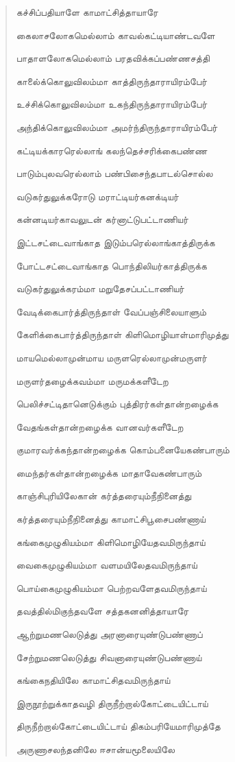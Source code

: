 \documentclass{article}
\begin{document}
\begin{quotation}
{கச்சிப்பதியாளே காமாட்சித்தாயாரே

கைலாசலோகமெல்லாம் காவல்கட்டியாண்டவளே

பாதாளலோகமெல்லாம் பரதவிக்கப்பண்ணசத்தி

காலை்க்கொலுவிலம்மா காத்திருந்தாராயிரம்பேர்

உச்சிக்கொலுவிலம்மா உகந்திருந்தாராயிரம்பேர்

அந்திக்கொலுவிலம்மா அமர்ந்திருந்தாராயிரம்பேர்

கட்டியக்காரரெல்லாங் கலந்தெச்சரிக்கைபண்ண

பாடும்புலவரெல்லாம் பண்பிசைந்தபாடல்சொல்ல

வடுகர்துலுக்கரோடு மராட்டியர்கனக்டியர்

கன்னடியர்காவலுடன் கர்னாட்டுபட்டாணியர்

இட்டசட்டைவாங்காத இடும்பரெல்லாங்காத்திருக்க

போட்டசட்டைவாங்காத பொந்திலியர்காத்திருக்க

வடுகர்துலுக்கரம்மா மறுதேசப்பட்டாணியர்

வேடிக்கைபார்த்திருந்தாள் வேப்பஞ்சிலையாளும்

கேளிக்கைபார்த்திருந்தாள் கிளிமொழியாள்மாரிமுத்து

மாயமெல்லாமுன்மாய மருளரெல்லாமுன்மருளர்

மருளர்தழைக்கவம்மா மருமக்களீடேற

பெலிச்சட்டிதானெடுக்கும் புத்திரர்கள்தான்றழைக்க

வேதங்கள்தான்றழைக்க வானவர்களீடேற

குமாரவர்க்கந்தான்றழைக்க கொம்பனையேகண்பாரும்

மைந்தர்கள்தான்றழைக்க மாதாவேகண்பாரும்

காஞ்சிபுரியிலேகான் கர்த்தரையும்நீநினைத்து

கர்த்தரையும்நீநினைத்து காமாட்சிபூசைபண்ணாய்

கங்கைமுழுகியம்மா கிளிமொழியேதவமிருந்தாய்

வைகைமுழுகியம்மா வளமயிலேதவமிருந்தாய்

பொய்கைமுழுகியம்மா பெற்றவளேதவமிருந்தாய்  ‌

தவத்தில்மிகுந்தவளே சத்தகனனித்தாயாரே

ஆற்றுமணலெடுத்து அரனாரையுண்டுபண்ணாப்

சேற்றுமணலெடுத்து சிவனாரையுண்டுபண்ணாய்

கங்கைநதியிலே காமாட்சிதவமிருந்தாய்

இருநூற்றுக்காதவழி திருநீற்றால்கோட்டையிட்டாய்

திருநீற்றால்கோட்டையிட்டாய் திகம்பரியேமாரிமுத்தே

அருணாசலந்தனிலே ஈசான்யமூலையிலே

}
\end{quotation}
\end{document}

